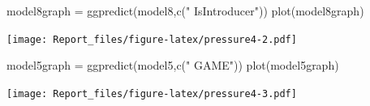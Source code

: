 \documentclass[
]{article}
\newenvironment{Shaded}{\begin{snugshade}}{\end{snugshade}}
\newcommand{\FunctionTok}[1]{\textcolor[rgb]{0.00,0.00,0.00}{#1}}
\newcommand{\NormalTok}[1]{#1}
\newcommand{\OtherTok}[1]{\textcolor[rgb]{0.56,0.35,0.01}{#1}}
\newcommand{\StringTok}[1]{\textcolor[rgb]{0.31,0.60,0.02}{#1}}
\begin{document}
\begin{Shaded}
\begin{Highlighting}[]
\NormalTok{model8graph }\OtherTok{=} \FunctionTok{ggpredict}\NormalTok{(model8,}\FunctionTok{c}\NormalTok{(}\StringTok{" IsIntroducer"}\NormalTok{))}
\FunctionTok{plot}\NormalTok{(model8graph)}
\end{Highlighting}
\end{Shaded}

\texttt{[image: Report\_files/figure-latex/pressure4-2.pdf]}

\begin{Shaded}
\begin{Highlighting}[]
\NormalTok{model5graph }\OtherTok{=} \FunctionTok{ggpredict}\NormalTok{(model5,}\FunctionTok{c}\NormalTok{(}\StringTok{" GAME"}\NormalTok{))}
\FunctionTok{plot}\NormalTok{(model5graph)}
\end{Highlighting}
\end{Shaded}

\texttt{[image: Report\_files/figure-latex/pressure4-3.pdf]}
\end{document}
